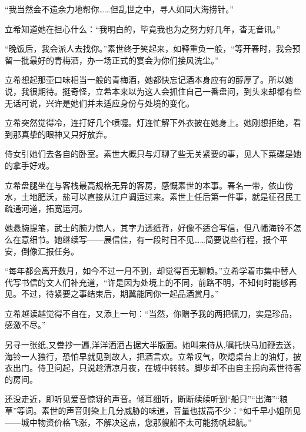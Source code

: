 \documentclass{article}
\begin{document}
“我当然会不遗余力地帮你……但乱世之中，寻人如同大海捞针。”



立希知道她在担心什么：“我明白的，毕竟我也为之努力好几年，杳无音讯。”



“晚饭后，我会派人去找你。”素世终于笑起来，如释重负一般，“等开春时，我会预留一批最好的青梅酒，办一场正式的宴会为你们接风洗尘。”



立希想起那壶口味相当一般的青梅酒，她都快忘记酒本身应有的醇厚了。所以她说，我很期待。挺奇怪，立希本来以为这人会抓住自己一番盘问，到头来却都有些无话可说，兴许是她们并未适应身份与处境的变化。



立希突然觉得冷，连打好几个喷嚏。灯连忙解下外衣披在她身上。她刚想拒绝，看到那真挚的眼神又只好放弃。



侍女引她们去各自的卧室。素世大概只与灯聊了些无关紧要的事，见人下菜碟是她的拿手好戏。



立希盘腿坐在与客栈最高规格无异的客房，感慨素世的本事。春名一带，依山傍水，土地肥沃，盐可以直接从江户调运过来。素世上任后第一件事，就是征召民工疏通河道，拓宽运河。



她悬腕提笔，武士的腕力惊人，其字力透纸背，好像不适合写信，但八幡海铃不怎么在意细节。她继续写——展信佳，有一段时日不见……简要说些行程，报个平安，倒像汇报任务。



“每年都会离开数月，如今不过一月不到，却觉得百无聊赖。”立希学着市集中替人代写书信的文人们补充道，“许是因为处境上的不同，前路不明，不知何时能够再见。不过，待紧要之事结束后，期冀能同你一起品酒赏月。”



立希越读越觉得不自在，又添上一句：“当然，你赠予我的两把佩刀，实是珍品，感激不尽。”



另寻一张纸,又誊抄一遍,洋洋洒洒占据大半版面。她叫来侍从,嘱托快马加鞭去送，海铃一人独行，恐怕早就见到故人，把酒言欢。立希叹气，吹熄桌台上的油灯，披衣出门。侍卫问起，只说趁清凉月夜，在城中转转。脚步却不由自主拐向素世待客的房间。



还没走近，即听见爱音惊讶的声音。倾耳细听，断断续续听到“船只”“出海”“粮草”等词。素世的声音则染上几分威胁的味道，音量也拔高不少：“如千早小姐所见——城中物资价格飞涨，不解决这点，您那艘船不太可能扬帆起航。”
\end{document}

